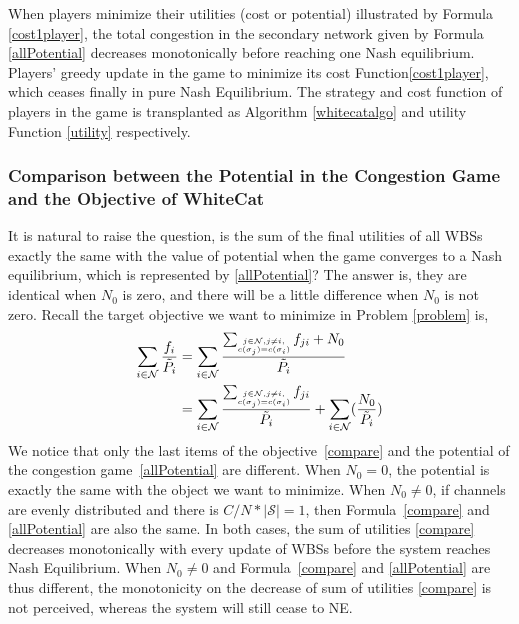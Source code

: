 \documentclass[times]{ettauth}
\theoremstyle{mytheoremstyle}
\theoremstyle{mytheoremstyle}
\theoremstyle{mytheoremstyle}
\begin{document}
When players minimize their utilities (cost or potential) illustrated by Formula \ref{cost1player}, the total congestion in the secondary network given by Formula \ref{allPotential} decreases monotonically before reaching one Nash equilibrium. Players' greedy update in the game to minimize its cost Function\ref{cost1player}, which ceases finally in pure Nash Equilibrium. The strategy and cost function of players in the game is transplanted as Algorithm \ref{whitecatalgo} and utility Function \ref{utility} respectively.


\subsubsection{Comparison between the Potential in the Congestion Game and the Objective of WhiteCat}
It is natural to raise the question, is the sum of the final utilities of all WBSs exactly the same with the value of potential when the game converges to a Nash equilibrium, which is represented by \ref{allPotential}?
The answer is, they are identical when $N_0$ is zero, and there will be a little difference when $N_0$ is not zero.
Recall the target objective we want to minimize in Problem \ref{problem} is,
\begin{equation}
\label{compare}
\begin{split}	
\sum_{i\in \mathcal{N}}\dfrac{f_i}{\tilde{P_i}}
& = \sum\limits_{i\in \mathcal{N}}\dfrac{\sum_{\tiny\substack{j\in \mathcal{N}, j\ne i,\\ c(\sigma_j)=c(\sigma_i)}}f_{ji}+N_0}{\tilde{P_i}}\\
& = \sum\limits_{i\in \mathcal{N}}\dfrac{\sum_{\tiny\substack{j\in \mathcal{N}, j\ne i,\\ c(\sigma_j)=c(\sigma_i)}}f_{ji}}{\tilde{P_i}} + \sum\limits_{i\in \mathcal{N}}  (\dfrac{N_0}{\tilde{P_i}})\\
\end{split}
\end{equation}
We notice that only the last items of the objective~\ref{compare} and the potential of the congestion game~\ref{allPotential} are different.
When $N_0=0$, the potential is exactly the same with the object we want to minimize.
When $N_0\neq 0$, if channels are evenly distributed and there is $C/N*\mid \mathcal{S}\mid = 1$, then Formula~\ref{compare} and \ref{allPotential} are also the same.
In both cases, the sum of utilities \ref{compare} decreases monotonically with every update of WBSs before the system reaches Nash Equilibrium.
%
When $N_0\neq 0$ and Formula~\ref{compare} and \ref{allPotential} are thus different, the monotonicity on the decrease of sum of utilities \ref{compare} is not perceived, whereas the system will still cease to NE.
\end{document}
